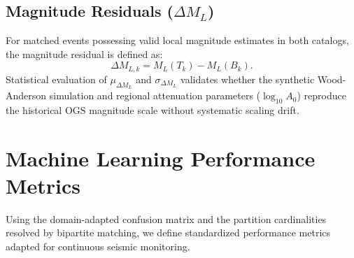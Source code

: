 \subsection{Magnitude Residuals ($\Delta M_L$)}
For matched events possessing valid local magnitude estimates in both catalogs, the magnitude residual is defined as:
\begin{equation}
  \Delta M_{L, k} = M_L(T_k) - M_L(B_k).
\end{equation}
Statistical evaluation of $\mu_{\Delta M_L}$ and $\sigma_{\Delta M_L}$ validates whether the synthetic Wood-Anderson simulation and regional attenuation parameters ($\log_{10} A_0$) reproduce the historical OGS magnitude scale without systematic scaling drift.

\section{Machine Learning Performance Metrics}
\label{sec:ml_metrics}

Using the domain-adapted confusion matrix and the partition cardinalities resolved by bipartite matching, we define standardized performance metrics adapted for continuous seismic monitoring.


